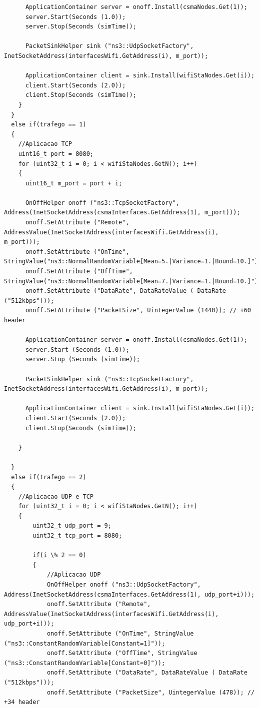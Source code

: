 \documentclass[12pt]{article}
\begin{document}
\begin{lstlisting}
      ApplicationContainer server = onoff.Install(csmaNodes.Get(1));
      server.Start(Seconds (1.0));
      server.Stop(Seconds (simTime));

      PacketSinkHelper sink ("ns3::UdpSocketFactory", InetSocketAddress(interfacesWifi.GetAddress(i), m_port));

      ApplicationContainer client = sink.Install(wifiStaNodes.Get(i));
      client.Start(Seconds (2.0));
      client.Stop(Seconds (simTime));
    }
  }
  else if(trafego == 1)
  {
    //Aplicacao TCP
    uint16_t port = 8080;
    for (uint32_t i = 0; i < wifiStaNodes.GetN(); i++)
    {
      uint16_t m_port = port + i;

      OnOffHelper onoff ("ns3::TcpSocketFactory", Address(InetSocketAddress(csmaInterfaces.GetAddress(1), m_port)));
      onoff.SetAttribute ("Remote",  AddressValue(InetSocketAddress(interfacesWifi.GetAddress(i), m_port)));
      onoff.SetAttribute ("OnTime", StringValue("ns3::NormalRandomVariable[Mean=5.|Variance=1.|Bound=10.]"));
      onoff.SetAttribute ("OffTime", StringValue("ns3::NormalRandomVariable[Mean=7.|Variance=1.|Bound=10.]"));
      onoff.SetAttribute ("DataRate", DataRateValue ( DataRate ("512kbps")));
      onoff.SetAttribute ("PacketSize", UintegerValue (1440)); // +60 header

      ApplicationContainer server = onoff.Install(csmaNodes.Get(1));
      server.Start (Seconds (1.0));
      server.Stop (Seconds (simTime));

      PacketSinkHelper sink ("ns3::TcpSocketFactory", InetSocketAddress(interfacesWifi.GetAddress(i), m_port));

      ApplicationContainer client = sink.Install(wifiStaNodes.Get(i));
      client.Start(Seconds (2.0));
      client.Stop(Seconds (simTime));
      
    }

  }
  else if(trafego == 2)
  {
  	//Aplicacao UDP e TCP
  	for (uint32_t i = 0; i < wifiStaNodes.GetN(); i++)
  	{
  		uint32_t udp_port = 9;
  		uint32_t tcp_port = 8080;

  		if(i \% 2 == 0)
  		{
  			//Aplicacao UDP
			OnOffHelper onoff ("ns3::UdpSocketFactory", Address(InetSocketAddress(csmaInterfaces.GetAddress(1), udp_port+i)));
			onoff.SetAttribute ("Remote",  AddressValue(InetSocketAddress(interfacesWifi.GetAddress(i), udp_port+i)));
			onoff.SetAttribute ("OnTime", StringValue ("ns3::ConstantRandomVariable[Constant=1]"));
			onoff.SetAttribute ("OffTime", StringValue ("ns3::ConstantRandomVariable[Constant=0]"));
			onoff.SetAttribute ("DataRate", DataRateValue ( DataRate ("512kbps")));
			onoff.SetAttribute ("PacketSize", UintegerValue (478)); // +34 header


\end{lstlisting}
\end{document}
